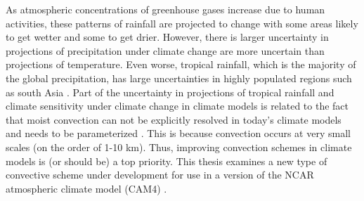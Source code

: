 \documentclass[letterpaper,12pt,titlepage,oneside,final]{book}
\begin{document}
As atmospheric concentrations of greenhouse gases increase due to human activities, these patterns of rainfall are projected to change with some areas likely to get wetter and some to get drier. However, there is larger uncertainty in projections of precipitation under climate change are more uncertain than projections of temperature. Even worse, tropical rainfall, which is the majority of the global precipitation, has large uncertainties in highly populated regions such as south Asia \citep{turner_climate_2012}. Part of the uncertainty in projections of tropical rainfall and climate sensitivity under climate change in climate models is related to the fact that moist convection can not be explicitly resolved in today's climate models and needs to be parameterized \citep{arakawa_cumulus_2004,randall_breaking_2003,rybka_uncertainties_2014}. This is because convection occurs at very small scales (on the order of 1-10 km). Thus, improving convection schemes in climate models is (or should be) a top priority. This thesis examines a new type of convective scheme under development for use in a version of the NCAR atmospheric climate model (CAM4) \citep{neale_description_2010}.
\end{document}

